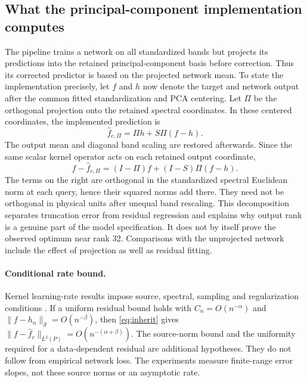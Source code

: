 \subsection{What the principal-component implementation computes}
The pipeline trains a network on all standardized bands but projects its predictions into
the retained principal-component basis before correction. Thus its corrected predictor is
based on the projected network mean. To state the implementation
precisely, let $f$ and $h$ now denote the target and network output after the common fitted
standardization and PCA centering. Let $\Pi$ be the orthogonal projection onto the retained
spectral coordinates. In these centered coordinates, the implemented prediction is
\[
 \widehat f_{c,\Pi}=\Pi h+S\Pi(f-h).
\]
The output mean and diagonal band scaling are restored afterwards. Since the same scalar
kernel operator acts on each retained output coordinate,
\begin{equation}\label{eq:projected-residual}
 f-\widehat f_{c,\Pi}=(I-\Pi)f+(I-S)\Pi(f-h).
\end{equation}
The terms on the right are orthogonal in the standardized spectral Euclidean norm at each
query, hence their squared norms add there. They need not be orthogonal in physical units
after unequal band rescaling. This decomposition separates truncation error from residual
regression and explains why output rank is a genuine part of the model specification. It
does not by itself prove the observed optimum near rank 32. Comparisons with the unprojected
network include the effect of projection as well as residual fitting.

\paragraph{Conditional rate bound.}
Kernel learning-rate results impose source, spectral, sampling and regularization conditions
\cite{cdv,sutherland,fs}. If a uniform residual bound holds with $C_n=O(n^{-\alpha})$
and $\|f-h_n\|_{\mathcal S}=O(n^{-\beta})$, then \eqref{eq:inherit} gives
$\|f-\widehat f_c\|_{L^2(P)}=O(n^{-(\alpha+\beta)})$. The source-norm bound and the
uniformity required for a data-dependent residual are additional hypotheses. They do not
follow from empirical network loss. The experiments measure finite-range error slopes,
not these source norms or an asymptotic rate.
